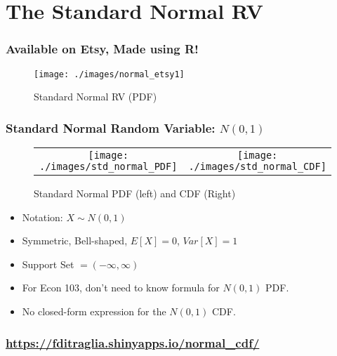 \section{The Standard Normal RV}
\begin{frame}
  \frametitle{Available on Etsy, Made using R!}
\begin{figure}
\texttt{[image: ./images/normal\_etsy1]}
\caption{Standard Normal RV (PDF)}
\end{figure}
\end{frame}

\begin{frame}
\frametitle{Standard Normal Random Variable: $N(0,1)$}

\begin{figure}[h]
  \centering
  \begin{tabular}{cc}
  \texttt{[image: ./images/std\_normal\_PDF]}
  &  
  \texttt{[image: ./images/std\_normal\_CDF]}
\end{tabular}
\caption{Standard Normal PDF (left) and CDF (Right)}
\end{figure}
\begin{itemize}
  \item Notation: $X \sim N(0,1)$
  \item Symmetric, Bell-shaped, $E[X]=0$, $Var[X]=1$
  \item Support Set $= (-\infty,\infty)$
  \item For Econ 103, don't need to know formula for $N(0,1)$ PDF.
  \item No closed-form expression for the $N(0,1)$ CDF.
\end{itemize}
\end{frame}


\begin{frame}
	\frametitle{\href{https://fditraglia.shinyapps.io/normal_cdf/}{https://fditraglia.shinyapps.io/normal\_cdf/}}

\begin{figure}
\end{figure}

\end{frame}

